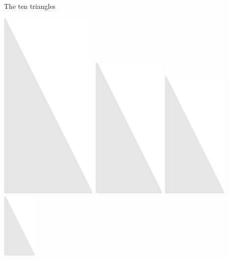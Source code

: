 \documentclass[14pt]{beamer}
\begin{document}
\begin{frame}{The ten triangles}
\begin{center}
            \includegraphics[scale=0.3]{figures/figure024d.pdf}\quad
            \includegraphics[scale=0.3]{figures/figure024c.pdf}\quad
            \includegraphics[scale=0.3]{figures/figure024b.pdf}\quad
            \includegraphics[scale=0.3]{figures/figure024a.pdf}\\\bigskip\bigskip


\end{center}
\end{frame}
\end{document}
